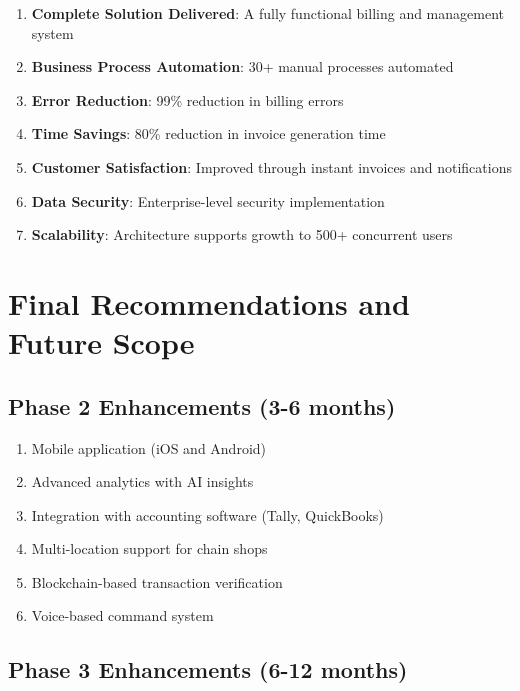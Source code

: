 \documentclass[12pt,a4paper]{report}
\begin{document}
\begin{enumerate}[label=\roman*)]
    \item \textbf{Complete Solution Delivered}: A fully functional billing and management system
    \item \textbf{Business Process Automation}: 30+ manual processes automated
    \item \textbf{Error Reduction}: 99\% reduction in billing errors
    \item \textbf{Time Savings}: 80\% reduction in invoice generation time
    \item \textbf{Customer Satisfaction}: Improved through instant invoices and notifications
    \item \textbf{Data Security}: Enterprise-level security implementation
    \item \textbf{Scalability}: Architecture supports growth to 500+ concurrent users
\end{enumerate}

\newpage


\section{Final Recommendations and Future Scope}

\subsection{Phase 2 Enhancements (3-6 months)}

\begin{enumerate}[label=\roman*)]
    \item Mobile application (iOS and Android)
    \item Advanced analytics with AI insights
    \item Integration with accounting software (Tally, QuickBooks)
    \item Multi-location support for chain shops
    \item Blockchain-based transaction verification
    \item Voice-based command system
\end{enumerate}

\subsection{Phase 3 Enhancements (6-12 months)}
\end{document}
